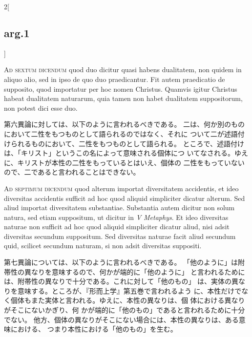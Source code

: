 \documentclass[paper=a4paper,fontsize=10pt,jafontsize=9pt,titlepage]{jlreq}
\begin{document}
\begin{paracol}{2}[\subsection{arg.1}]
\switchcolumn*[\subsection{ad.6}]

{\scshape Ad sextum dicendum} quod duo dicitur quasi
 habens dualitatem, non quidem in aliquo alio, sed in ipso de quo duo
 praedicantur. Fit autem praedicatio de supposito, quod importatur per
 hoc nomen Christus. Quamvis igitur Christus habeat dualitatem
 naturarum, quia tamen non habet dualitatem suppositorum, non potest
 dici esse duo.

\switchcolumn

第六異論に対しては、以下のように言われるべきである。
二は、何か別のものにおいて二性をもつものとして語られるのではなく、それに
 ついて二が述語付けられるものにおいて、二性をもつものとして語られる。
ところで、述語付けは、「キリスト」というこの名によって意味される個体につ
 いてなされる。ゆえに、キリストが本性の二性をもっているとはいえ、個体の
 二性をもっていないので、二であると言われることはできない。

\switchcolumn*[\subsection{ad.7}]

{\scshape Ad septimum dicendum} quod alterum importat
 diversitatem accidentis, et ideo diversitas accidentis sufficit ad hoc
 quod aliquid simpliciter dicatur alterum. Sed aliud importat
 diversitatem substantiae. Substantia autem dicitur non solum natura,
 sed etiam suppositum, ut dicitur in {\itshape V Metaphys}. Et ideo diversitas
 naturae non sufficit ad hoc quod aliquid simpliciter dicatur aliud,
 nisi adsit diversitas secundum suppositum. Sed diversitas naturae facit
 aliud secundum quid, scilicet secundum naturam, si non adsit diversitas
 suppositi.

\switchcolumn

第七異論については、以下のように言われるべきである。
「他のように」は附帯性の異なりを意味するので、何かが端的に「他のように」
 と言われるためには、附帯性の異なりで十分である。これに対して「他のもの」
 は、実体の異なりを意味する。ところが、『形而上学』第五巻で言われるよう
 に、本性だけでなく個体もまた実体と言われる。ゆえに、本性の異なりは、個
 体における異なりがそこにないかぎり、何
 かが端的に「他のもの」であると言われるために十分でない。
他方、個体の異なりがそこにない場合には、本性の異なりは、ある意味における、
 つまり本性における「他のもの」を生む。

\end{paracol}
\end{document}
